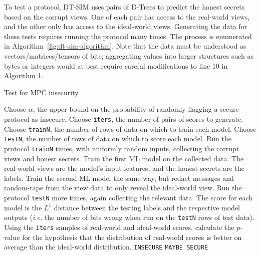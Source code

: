 \documentclass[acmlarge, manuscript, screen, review, anonymous, table]{acmart}
\newcommand{\ie}{\textit{i.e.}\xspace}
\newcommand{\toolname}{\textsc{DT-SIM}\xspace}
\begin{document}
To test a protocol, \toolname uses pairs of D-Trees to predict the honest secrets based on the corrupt views.
One of each pair has access to the real-world views, and the other only has access to the ideal-world views.
Generating the data for these tests requires running the protocol many times.
The process is enumerated in Algorithm~\ref{fig:dt-sim-algorithm}.
Note that the data must be understood as vectors/matrices/tensors of bits;
aggregating values into larger structures such as bytes or integers would at best require careful modifications to line 10 in Algorithm 1.
\begin{algorithm}  %
  \caption{Test for MPC insecurity}
  \label{fig:dt-sim-algorithm}
  \begin{algorithmic}[1]
    \STATE Choose $\alpha$, the upper-bound on the probability of randomly flagging a secure protocol as insecure.
    \STATE Choose \texttt{iters}, the number of pairs of scores to generate.
    \STATE Choose \texttt{trainN}, the number of rows of data on which to train each model.
    \STATE Choose \texttt{testN}, the number of rows of data on which to score each model.
      \STATE Run the protocol \texttt{trainN} times,
             with uniformly random inputs,
             collecting the corrupt views and honest secrets.
      \STATE Train the first ML model on the collected data.
             The real-world views are the model's input-features, and the honest secrets are the labels.
      \STATE Train the second ML model the same way, but redact messages and random-tape from the view data to only reveal the ideal-world view.
      \STATE Run the protocol \texttt{testN} more times, again collecting the relevant data.
      \STATE The score for each model is the $L^1$ distance between the testing labels and the respective model outputs
             (\ie the number of bits wrong when run on the \texttt{testN} rows of test data).
    \ENDFOR
    \STATE Using the \texttt{iters} samples of real-world and ideal-world scores,
           calculate the $p$-value for the hypothesis that
           the distribution of real-world scores is better on average than the ideal-world distribution.
     \RETURN \texttt{INSECURE} \ELSE \RETURN \texttt{MAYBE SECURE} \ENDIF
  \end{algorithmic}
\end{algorithm}
\end{document}

